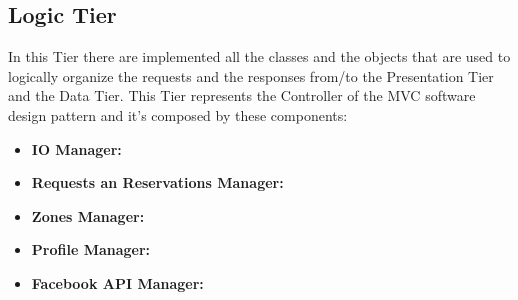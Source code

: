 \documentclass[../../../../../../dd.tex]{subfiles}
\begin{document}
	\subsection{Logic Tier}
		In this Tier there are implemented all the classes and the objects that are used to logically organize the requests and the responses from/to the Presentation Tier and the Data Tier.
		This Tier represents the Controller of the MVC software design pattern and it's composed by these components:
		\begin{itemize}
			\item \textbf{IO Manager:} %
			\item \textbf{Requests an Reservations Manager:}
			\item \textbf{Zones Manager:}
			\item \textbf{Profile Manager:}
			\item \textbf{Facebook API Manager:}
		\end{itemize}
	
\end{document}
